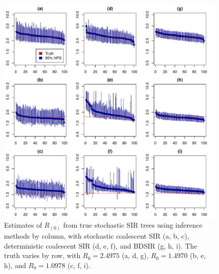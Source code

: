 \documentclass[12pt,titlepage]{article}
\newcommand{\stochCoalSIR}{stochastic coalescent SIR}
\newcommand{\deterCoalSIR}{deterministic coalescent SIR}
\newcommand{\BDSIR}{BDSIR}
\begin{document}
\begin{figure}[ht]
    \centering
    	\includegraphics[width=7in]{Fig3.pdf}
\caption{Estimates of $R_{(0)}$ from true stochastic SIR trees using inference methods by column, with 
	\stochCoalSIR{} (a, b, c), \deterCoalSIR{} (d, e, f), and \BDSIR{} (g, h, i).  The truth varies 
	by row, with $R_{0}=2.4975$ (a, d, g), $R_{0}=1.4970$ (b, e, h), and $R_{0}=1.0978$ (c, f, i).
}
\end{figure}
%
%
\end{document}
